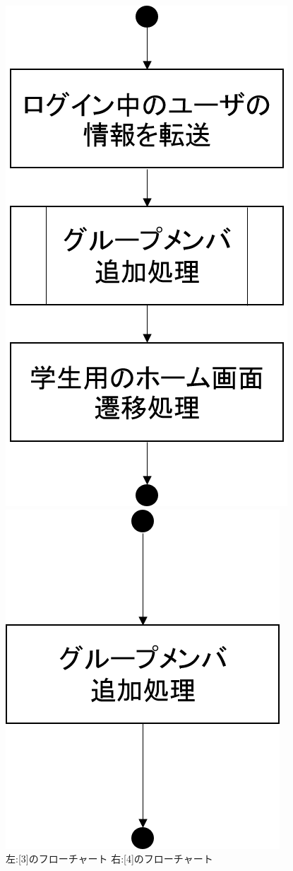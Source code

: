 \begin{figure}[htbp]
 \begin{minipage}{0.5\hsize}
  \begin{center}
   \includegraphics[width=0.5\linewidth,clip]{./img/join_group/sub3.png}
  \end{center}
 \end{minipage}
 \begin{minipage}{0.5\hsize}
  \begin{center}
   \includegraphics[width=0.5\linewidth,clip]{./img/join_group/sub4.png}
  \end{center}
 \end{minipage}
 \caption{左:[3]のフローチャート 右:[4]のフローチャート}\label{fig:joingroupflow0}
\end{figure}




